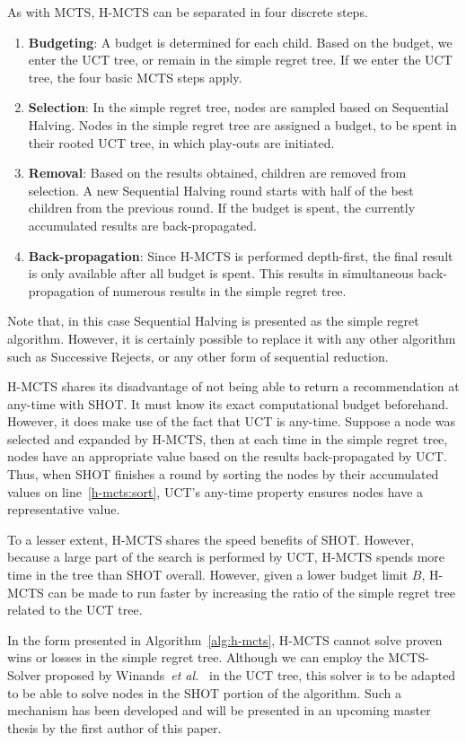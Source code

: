 \documentclass[a4paper]{llncs}
\begin{document}
As with MCTS, H-MCTS can be separated in four discrete steps.
\begin{enumerate}
\item \textbf{Budgeting}: A budget is determined for each child. Based on the budget, we enter the UCT tree, or remain in the simple regret tree. If we enter the UCT tree, the four basic MCTS steps apply.
\item \textbf{Selection}: In the simple regret tree, nodes are sampled based on Sequential Halving. Nodes in the simple regret tree are assigned a budget, to be spent in their rooted UCT tree, in which play-outs are initiated.
\item \textbf{Removal}: Based on the results obtained, children are removed from selection. A new Sequential Halving round starts with half of the best children from the previous round. If the budget is spent, the currently accumulated results are back-propagated.
\item \textbf{Back-propagation}: Since H-MCTS is performed depth-first, the final result is only available after all budget is spent. This results in simultaneous back-propagation of numerous results in the simple regret tree.
\end{enumerate}
Note that, in this case Sequential Halving is presented as the simple regret algorithm. However, it is certainly possible to replace it with any other algorithm such as Successive Rejects, or any other form of sequential reduction.

H-MCTS shares its disadvantage of not being able to return a recommendation at any-time with SHOT. It must know its exact computational budget beforehand. However, it does make use of the fact that UCT is any-time. Suppose a node was selected and expanded by H-MCTS, then at each time in the simple regret tree, nodes have an appropriate value based on the results back-propagated by UCT. Thus, when SHOT finishes a round by sorting the nodes by their accumulated values on line~\ref{h-mcts:sort}, UCT's any-time property ensures nodes have a representative value.

To a lesser extent, H-MCTS shares the speed benefits of SHOT. However, because a large part of the search is performed by UCT, H-MCTS spends more time in the tree than SHOT overall. However, given a lower budget limit $B$, H-MCTS can be made to run faster by increasing the ratio of the simple regret tree related to the UCT tree.

In the form presented in Algorithm~\ref{alg:h-mcts}, H-MCTS cannot solve proven wins or losses in the simple regret tree. Although we can employ the MCTS-Solver proposed by Winands~\emph{et al.}~\cite{Winands2008} in the UCT tree, this solver is to be adapted to be able to solve nodes in the SHOT portion of the algorithm. Such a mechanism has been developed and will be presented in an upcoming master thesis by the first author of this paper.
\end{document}
